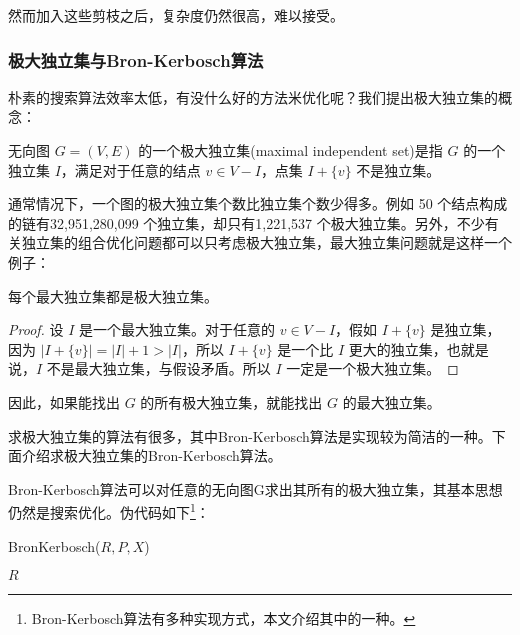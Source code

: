 \documentclass[lang=cn,11pt,a4paper]{elegantpaper}
\begin{document}
然而加入这些剪枝之后，复杂度仍然很高，难以接受。

\subsubsection{极大独立集与Bron-Kerbosch算法}
朴素的搜索算法效率太低，有没什么好的方法米优化呢？我们提出极大独立集的概念：
\begin{definition}
    无向图 $G=(V, E)$ 的一个极大独立集(maximal independent set)是指 $G$ 的一个独立集 $I$，满足对于任意的结点 $v \in V - I$，点集 $I + \{v\}$ 不是独立集。
\end{definition}

通常情况下，一个图的极大独立集个数比独立集个数少得多。例如 50 个结点构成的链有32,951,280,099 个独立集，却只有1,221,537 个极大独立集。另外，不少有关独立集的组合优化问题都可以只考虑极大独立集，最大独立集问题就是这样一个例子：
\begin{theorem}
    每个最大独立集都是极大独立集。
\end{theorem}
\begin{proof}
    设 $I$ 是一个最大独立集。对于任意的 $v \in V - I$，假如 $I + \{v\}$ 是独立集，因为 $|I + \{v\}| = |I| + 1 > |I|$，所以 $I + \{v\}$ 是一个比 $I$ 更大的独立集，也就是说，$I$ 不是最大独立集，与假设矛盾。所以 $I$ 一定是一个极大独立集。
\end{proof}

因此，如果能找出 $G$ 的所有极大独立集，就能找出 $G$ 的最大独立集。

求极大独立集的算法有很多，其中Bron-Kerbosch算法是实现较为简洁的一种。下面介绍求极大独立集的Bron-Kerbosch算法。

Bron-Kerbosch算法可以对任意的无向图G求出其所有的极大独立集，其基本思想仍然是搜索优化。伪代码如下\footnote{Bron-Kerbosch算法有多种实现方式，本文介绍其中的一种。}：

\begin{algorithm} 
	\caption{BronKerbosch($R, P, X$)}\label{alg1} 
	\begin{algorithmic}[1]
            \PRINT $R$
        \ENDIF
        \ENDFOR
	\end{algorithmic} 
\end{algorithm}
\end{document}
